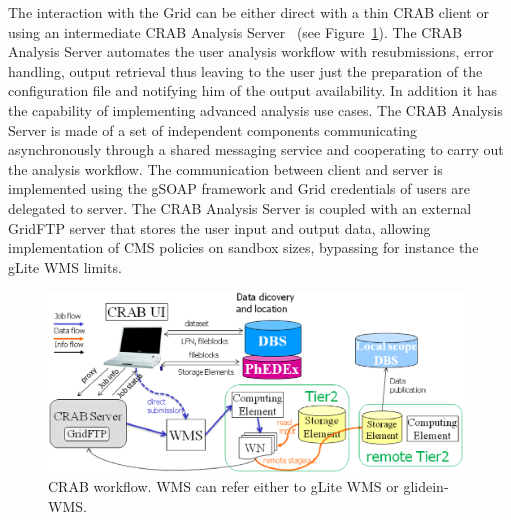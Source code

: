 The interaction with the Grid can be either direct with a thin CRAB client or using an intermediate CRAB Analysis Server~\cite{RefCRAB} (see Figure~\ref{fig:CRABWorkflow}). The CRAB Analysis Server automates the user analysis workflow with resubmissions, error handling, output retrieval thus leaving to the user just the preparation of the configuration file and notifying him of the output availability. In addition it has the capability of implementing advanced analysis use cases.
The CRAB Analysis Server is made of a set of independent components communicating asynchronously through a shared messaging service and cooperating to carry out the analysis workflow. The communication between client and server is implemented using the gSOAP framework and Grid credentials of users are delegated to server.
The CRAB Analysis Server is coupled with an external GridFTP server %
 that stores the user input and output data, allowing implementation of CMS policies on sandbox sizes, bypassing for instance the gLite WMS limits.


\begin{figure}
 \includegraphics[width=0.98\textwidth]{CRABWorkflow.eps}
\caption{CRAB workflow. WMS can refer either to gLite WMS or glidein-WMS.}
\label{fig:CRABWorkflow}
\end{figure}

